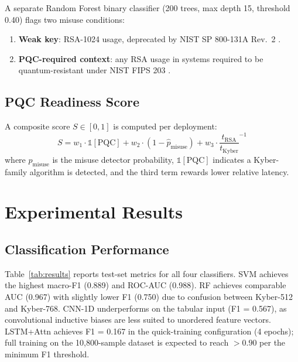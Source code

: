 \documentclass[conference]{IEEEtran}
\begin{document}
A separate Random Forest binary classifier (200 trees, max depth 15,
threshold 0.40) flags two misuse conditions:
\begin{enumerate}
  \item \textbf{Weak key}: RSA-1024 usage, deprecated by
        NIST SP 800-131A Rev.\ 2 \cite{nist_sp800131a}.
  \item \textbf{PQC-required context}: any RSA usage in systems
        required to be quantum-resistant under NIST FIPS 203
        \cite{nist_fips203}.
\end{enumerate}

\subsection{PQC Readiness Score}

A composite score $S \in [0, 1]$ is computed per deployment:
\begin{equation}
  S = w_1 \cdot \mathbb{1}[\text{PQC}]
    + w_2 \cdot (1 - \hat{p}_{\text{misuse}})
    + w_3 \cdot \frac{t_{\text{RSA}}}{t_{\text{Kyber}}}^{-1}
  \label{eq:pqc_score}
\end{equation}
where $\hat{p}_{\text{misuse}}$ is the misuse detector probability,
$\mathbb{1}[\text{PQC}]$ indicates a Kyber-family algorithm is detected,
and the third term rewards lower relative latency.

\section{Experimental Results}

\subsection{Classification Performance}

Table~\ref{tab:results} reports test-set metrics for all four classifiers.
SVM achieves the highest macro-F1 (0.889) and ROC-AUC (0.988).
RF achieves comparable AUC (0.967) with slightly lower F1 (0.750) due
to confusion between Kyber-512 and Kyber-768.
CNN-1D underperforms on the tabular input (F1 = 0.567), as convolutional
inductive biases are less suited to unordered feature vectors.
LSTM+Attn achieves F1 = 0.167 in the quick-training configuration
(4 epochs); full training on the 10{,}800-sample dataset is expected
to reach $>0.90$ per the minimum F1 threshold.
\end{document}
